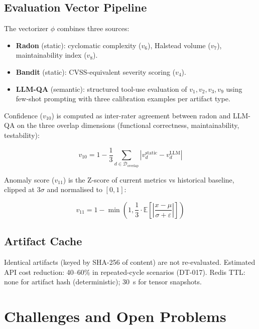 \documentclass[manuscript,review,anonymous]{acmart}
\begin{document}
\subsection{Evaluation Vector Pipeline}

The vectorizer $\phi$ combines three sources:
\begin{itemize}
  \item \textbf{Radon} (static): cyclomatic complexity ($v_6$), Halstead volume
    ($v_7$), maintainability index ($v_8$).
  \item \textbf{Bandit} (static): CVSS-equivalent severity scoring ($v_4$).
  \item \textbf{LLM-QA} (semantic): structured tool-use evaluation of $v_1, v_2, v_3, v_9$
    using few-shot prompting with three calibration examples per artifact type.
\end{itemize}

Confidence ($v_{10}$) is computed as inter-rater agreement between radon and LLM-QA
on the three overlap dimensions (functional correctness, maintainability, testability):

\begin{equation}
  v_{10} = 1 - \frac{1}{3} \sum_{d \in \mathcal{D}_\text{overlap}}
  \left| v_d^{\text{static}} - v_d^{\text{LLM}} \right|
\end{equation}

Anomaly score ($v_{11}$) is the Z-score of current metrics vs historical baseline,
clipped at $3\sigma$ and normalised to $[0,1]$:

\begin{equation}
  v_{11} = 1 - \min\!\left(1, \frac{1}{3} \cdot
  \mathbb{E}\!\left[\left|\frac{x - \mu}{\sigma + \varepsilon}\right|\right]\right)
\end{equation}

\subsection{Artifact Cache}

Identical artifacts (keyed by SHA-256 of content) are not re-evaluated.
Estimated API cost reduction: 40--60\% in repeated-cycle scenarios (DT-017).
Redis TTL: none for artifact hash (deterministic); 30~s for tensor snapshots.

\section{Challenges and Open Problems}
\end{document}
